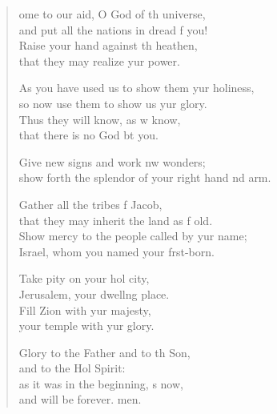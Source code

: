 \settowidth{\versewidth}{show forth the splendor of your right hand and arm.}
\begin{verse}%
  \begin{patverse}
ome to our aid, O God of th universe,\Med\\
and put all the nations in dread f you!\\
Raise your hand against th heathen,\Med\\
that they may realize yur power.

As you have used us to show them yur holiness,\Med\\
so now use them to show us yur glory.\\
Thus they will know, as w know,\Med\\
that there is no God bt you.

Give new signs and work nw wonders;\Med\\
show forth the splendor of your right hand nd arm.

Gather all the tribes f Jacob,\Med\\
that they may inherit the land as f old.\\
Show mercy to the people called by yur name;\Med\\
Israel, whom you named your f\pointup{\i}rst-born.

Take pity on your hol city,\Med\\
Jerusalem, your dwell\pointup{\i}ng place.\\
Fill Zion with yur majesty,\Med\\
your temple with yur glory.

Glory to the Father and to th Son,\Med\\
and to the Hol Spirit:\\
as it was in the beginning, \pointup{\i}s now,\Med\\
and will be forever. men. 
  \end{patverse}
\end{verse}
